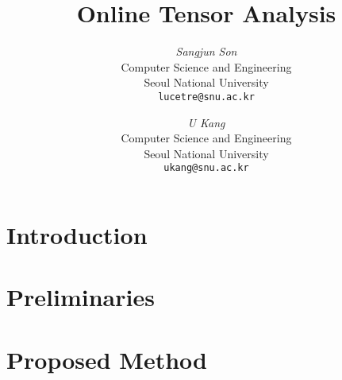 \documentclass[10pt]{article}
\begin{document}
\newcommand{\method}{\textsc{OnlineTensorAnalysis}\xspace}
\newcommand{\cpals}{CP--ALS\xspace}
\newcommand{\ocp}{OnlineCP\xspace}
\newcommand{\hosvd}{HOSVD\xspace}

\newcommand\norm[1]{\left\lVert#1\right\rVert}
\newcommand{\beq}{\begin{equation}}
\newcommand{\eeq}{\end{equation}}
\newcommand{\bit}{\begin{itemize*}}
\newcommand{\eit}{\end{itemize*}}
\newcommand{\goal}[1]{ {\noindent {$\Rightarrow$} \em {#1} } }
\newcommand{\hide}[1]{}
\newcommand{\comment}[1]{ {\footnotesize {#1} } }
\newtheorem{lemma}{Lemma}
\newtheorem{theorem}{Theorem}
\newtheorem{proof}{Proof}
\newtheorem{defn}{Definition}
\newtheorem{algo}{Algorithm}
\newtheorem{observation}{Observation}

\title{Online Tensor Analysis}

\author{ {\em Sangjun Son} \\
	    Computer Science and Engineering \\
	    Seoul National University\\
	    {\tt lucetre@snu.ac.kr}
	 \and
	 {\em U Kang} \\
	    Computer Science and Engineering \\
	    Seoul National University\\
	     {\tt ukang@snu.ac.kr}
        }


\maketitle
\begin{abstract}
    
\end{abstract}

\section{Introduction}
    \label{sec:intro}
    

\section{Preliminaries}
    \label{sec:prelim}
    
    
\newpage
\section{Proposed Method}
    \label{sec:proposed}
  	
\end{document}
